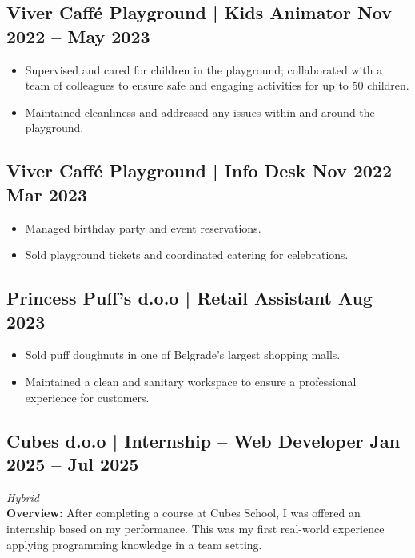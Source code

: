 \documentclass[11pt]{article}
\begin{document}
\subsection{Viver Caffé Playground | Kids Animator \hfill Nov 2022 -- May 2023}
\begin{itemize}[leftmargin=*]
  \item Supervised and cared for children in the playground; collaborated with a team of colleagues to ensure safe and engaging activities for up to 50 children.
  \item Maintained cleanliness and addressed any issues within and around the playground.
\end{itemize}

\subsection{Viver Caffé Playground | Info Desk \hfill Nov 2022 -- Mar 2023}
\begin{itemize}[leftmargin=*]
  \item Managed birthday party and event reservations.
  \item Sold playground tickets and coordinated catering for celebrations.
\end{itemize}

\subsection{Princess Puff's d.o.o | Retail Assistant \hfill Aug 2023}
\begin{itemize}[leftmargin=*]
  \item Sold puff doughnuts in one of Belgrade’s largest shopping malls.
  \item Maintained a clean and sanitary workspace to ensure a professional experience for customers.
\end{itemize}

\subsection{Cubes d.o.o | Internship – Web Developer \hfill Jan 2025 -- Jul 2025}
\textit{Hybrid}\\
\textbf{Overview:} After completing a course at Cubes School, I was offered an internship based on my performance. This was my first real-world experience applying programming knowledge in a team setting.
\end{document}
